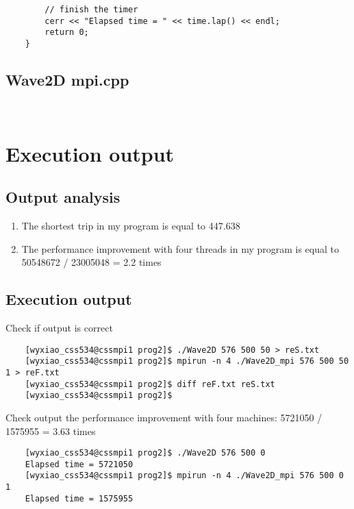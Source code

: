 \documentclass[11pt, letterpaper]{article}
\begin{document}
\begin{lstlisting}
		// finish the timer
		cerr << "Elapsed time = " << time.lap() << endl;
		return 0;
	}
	\end{lstlisting}
	\pagebreak
	
	\subsection{Wave2D mpi.cpp}
	\vspace{-0.2in}
	\begin{lstlisting}
	
	\end{lstlisting}
	
	
	
	\section {Execution output}
	\subsection{Output analysis}
	\begin{enumerate} 
		\item The shortest trip in my program is equal to 447.638
		\item The performance improvement with four threads in my program is equal to 50548672 / 23005048 = 2.2 times
	\end{enumerate}
	
	\subsection{Execution output}
	\noindent \large Check if output is correct
	\vspace{-0.2in}
	\begin{lstlisting}
	[wyxiao_css534@cssmpi1 prog2]$ ./Wave2D 576 500 50 > reS.txt
	[wyxiao_css534@cssmpi1 prog2]$ mpirun -n 4 ./Wave2D_mpi 576 500 50 1 > reF.txt
	[wyxiao_css534@cssmpi1 prog2]$ diff reF.txt reS.txt
	[wyxiao_css534@cssmpi1 prog2]$
	\end{lstlisting}
	
	\noindent \large Check output the performance improvement with four machines: 5721050 / 1575955 = 3.63 times
	\vspace{-0.2in}
	\begin{lstlisting}
	[wyxiao_css534@cssmpi1 prog2]$ ./Wave2D 576 500 0
	Elapsed time = 5721050
	[wyxiao_css534@cssmpi1 prog2]$ mpirun -n 4 ./Wave2D_mpi 576 500 0 1
	Elapsed time = 1575955
	\end{lstlisting}
	
\end{document}
